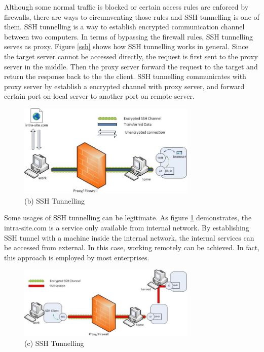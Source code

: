 \documentclass{article}
\begin{document}
Although some normal traffic is blocked or certain access rules are enforced by firewalls, there are ways 
to circumventing those rules and SSH tunnelling is one of them. 
SSH tunnelling is a way to establish encrypted communication channel between two computers. In terms of 
bypassing the firewall rules, SSH tunnelling serves as proxy. 
Figure \ref{ssh} shows how SSH tunnelling works in general.
Since the target server cannot be accessed directly, the request is first sent to the proxy 
server in the middle. Then the proxy server forward the request to the target and return the response 
back to the the client. SSH tunnelling communicates with proxy server by establish a encrypted channel with 
proxy server, and forward certain port on local server to another port on remote server.

\begin{figure}[H]
  \includegraphics[width=8.5cm]{ssh1}
  \caption{(b) SSH Tunnelling\cite{chamith_2012}}
  \label{ssh1}
\end{figure}

Some usages of SSH tunnelling can be legitimate. As figure \ref{ssh1} demonstrates, the intra-site.com is 
a service only available from internal network. By establishing SSH tunnel with a machine inside the internal 
network, the internal services can be accessed from external. In this case, working remotely can be achieved. 
In fact, this approach is employed by most enterprises.

\begin{figure}[H]
  \includegraphics[width=8.5cm]{ssh2}
  \caption{(c) SSH Tunnelling \cite{chamith_2012}}
  \label{ssh2}
\end{figure}
\end{document}
